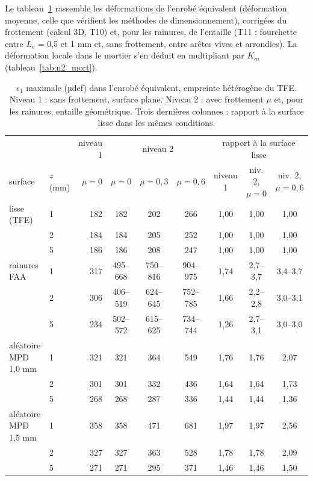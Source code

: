 Le tableau~\ref{tab:n2_synthese} rassemble les déformations de l'enrobé équivalent
(déformation moyenne, celle que vérifient les méthodes de dimensionnement), corrigées du
frottement (calcul 3D, T10) et, pour les rainures, de l'entaille (T11 : fourchette entre $L_c$ =
0,5 et 1 mm et, sans frottement, entre arêtes vives et arrondies). La déformation locale dans
le mortier s'en déduit en multipliant par $K_m$ (tableau~\ref{tab:n2_mort}).
\begin{table}[H]\centering\small
\caption{$\epsilon_1$ maximale (µdef) dans l'enrobé équivalent, empreinte hétérogène du TFE.
Niveau 1 : sans frottement, surface plane. Niveau 2 : avec frottement $\mu$ et, pour les rainures,
entaille géométrique. Trois dernières colonnes : rapport à la surface lisse dans les mêmes
conditions.}\label{tab:n2_synthese}
\begin{tabular}{llr ccc ccc}\toprule
& & niveau 1 & \multicolumn{3}{c}{niveau 2} & \multicolumn{3}{c}{rapport à la surface lisse}\\
\cmidrule(lr){4-6}\cmidrule(lr){7-9}
surface & $z$ (mm) & $\mu=0$ & $\mu=0$ & $\mu=0{,}3$ & $\mu=0{,}6$ & niveau 1 & niv. 2, $\mu=0$ & niv. 2, $\mu=0{,}6$\\\midrule
lisse (TFE) & 1 & 182 & 182 & 202 & 266 & 1,00 & 1,00 & 1,00\\
 & 2 & 184 & 184 & 205 & 252 & 1,00 & 1,00 & 1,00\\
 & 5 & 186 & 186 & 208 & 247 & 1,00 & 1,00 & 1,00\\
\addlinespace
rainures FAA & 1 & 317 & 495--668 & 750--816 & 904--975 & 1,74 & 2,7--3,7 & 3,4--3,7\\
 & 2 & 306 & 406--519 & 624--645 & 752--785 & 1,66 & 2,2--2,8 & 3,0--3,1\\
 & 5 & 234 & 502--572 & 615--625 & 734--744 & 1,26 & 2,7--3,1 & 3,0--3,0\\
\addlinespace
aléatoire MPD 1,0 mm & 1 & 321 & 321 & 364 & 549 & 1,76 & 1,76 & 2,07\\
 & 2 & 301 & 301 & 332 & 436 & 1,64 & 1,64 & 1,73\\
 & 5 & 268 & 268 & 287 & 336 & 1,44 & 1,44 & 1,36\\
\addlinespace
aléatoire MPD 1,5 mm & 1 & 358 & 358 & 471 & 681 & 1,97 & 1,97 & 2,56\\
 & 2 & 327 & 327 & 363 & 528 & 1,78 & 1,78 & 2,09\\
 & 5 & 271 & 271 & 295 & 371 & 1,46 & 1,46 & 1,50\\
\bottomrule\end{tabular}\end{table}
